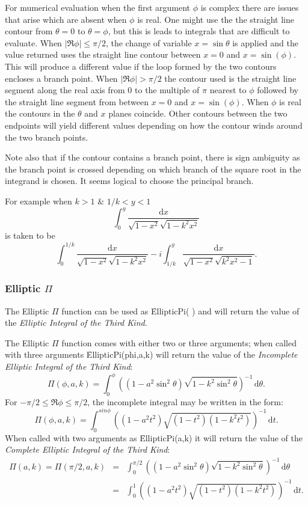 For mumerical evaluation when the first argument $\phi$ is complex there are issues that
arise which are absent when $\phi$ is real. One might use the the straight line contour
from $\theta=0$ to $\theta=\phi$, but this is leads to integrals that are difficult to
evaluate. When $|\Re{\phi}| \leq \pi/2$, the change of variable $x=\sin \theta$ is applied
and the value returned uses the straight line contour between $x=0$ and $x=\sin(\phi)$.
This will  produce a different value if the loop formed by the two contours encloses a
branch point. When $|\Re{\phi}| > \pi/2$ the contour used is the straight line segment
along the real axis from 0 to the multiple of $\pi$ nearest to $\phi$ followed by the
straight line segment from between $x=0$ and $x=\sin(\phi)$. When $\phi$ is real the
contours in the $\theta$ and $x$ planes coincide. Other contours between the
two endpoints will yield different values depending on how the contour winds around the
two branch points.

Note also that if the contour contains a branch point, there is sign ambiguity as the
branch point is crossed depending on which branch of the square root in the integrand is
chosen. It seems logical to choose the principal branch. 

For example when $k>1$ \& $1/k < y <1$
\[ \int_0^y \frac{\mathrm{d}x}{\sqrt{1-x^2}\sqrt{1-k^2x^2}}\]
is taken to be
\[\int_0^{1/k} \frac{\mathrm{d}x}{\sqrt{1-x^2}\sqrt{1-k^2x^2}}
-i\int_{1/k}^y \frac{\mathrm{d}x}{\sqrt{1-x^2}\sqrt{k^2x^2-1}}.\]

\subsubsection{Elliptic $\Pi$}
\hypertarget{operator:ELLIPTICPI}{}
The Elliptic $\Pi$ function can be used as \f{EllipticPi( )} and
will return the value of the \emph{Elliptic Integral of the
Third Kind}.

The Elliptic $\Pi$ function comes with either two or three arguments;
when called with three arguments \f{EllipticPi(phi,a,k)} will return the
value of the \emph{Incomplete Elliptic Integral of the Third Kind}:
\[\Pi(\phi,a,k)=\int_0^{\phi}
\left((1-a^2\sin^2 \theta)\sqrt{1-k^2 \sin^2 \theta}\right)^{-1}
\,\mathrm{d}\theta.\]
For $-\pi/2 \leq \Re{\phi} \leq \pi/2$, the incomplete integral may be written in
the form:
\[\Pi(\phi,a,k)=\int_0^{sin \phi}
\left((1-a^2t^2)\sqrt{(1-t^2)(1-k^2t^2)}\right)^{-1}\,\mathrm{d}t.\]
When called with two arguments as \f{EllipticPi(a,k)}
it will return the value of the
\emph{Complete Elliptic Integral of the Third Kind}:
\begin{eqnarray*}
  \Pi(a, k)= \Pi(\pi/2,a,k) & = &
\int_0^{\pi/2} \left((1-a^2\sin^2 \theta)\sqrt{1-k^2 \sin^2 \theta}\right)^{-1}
\,\mathrm{d}\theta \\
& =& \int_0^1 \left((1-a^2t^2)\sqrt{(1-t^2)(1-k^2t^2)}\right)^{-1}\,\mathrm{d}t.
\end{eqnarray*}

